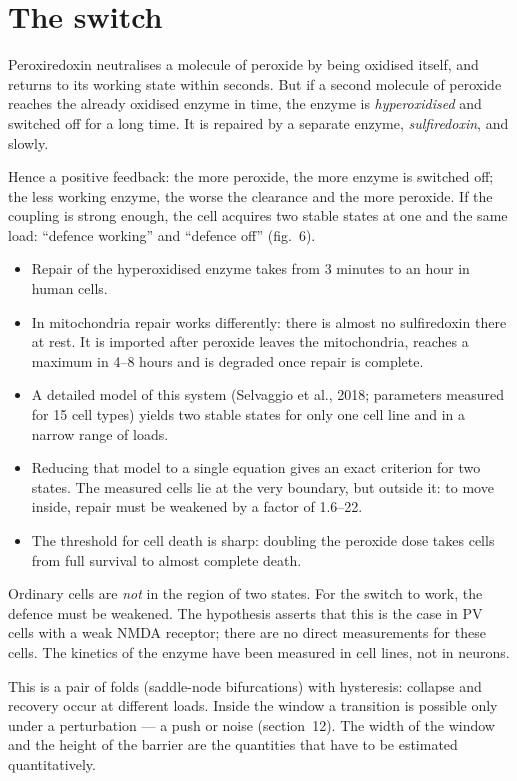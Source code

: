 \section{The switch}
Peroxiredoxin neutralises a molecule of peroxide by being oxidised itself, and returns to its working state within seconds. But if a second molecule of peroxide reaches the already oxidised enzyme in time, the enzyme is \emph{hyperoxidised} and switched off for a long time. It is repaired by a separate enzyme, \emph{sulfiredoxin}, and slowly.

Hence a positive feedback: the more peroxide, the more enzyme is switched off; the less working enzyme, the worse the clearance and the more peroxide. If the coupling is strong enough, the cell acquires two stable states at one and the same load: ``defence working'' and ``defence off'' (fig.~6).
\facts
\begin{itemize}
\item Repair of the hyperoxidised enzyme takes from 3 minutes to an hour in human cells.\tS
\item In mitochondria repair works differently: there is almost no sulfiredoxin there at rest. It is imported after peroxide leaves the mitochondria, reaches a maximum in 4--8 hours and is degraded once repair is complete.\tS
\item A detailed model of this system (Selvaggio et al., 2018; parameters measured for 15 cell types) yields two stable states for only one cell line and in a narrow range of loads.\tS
\item Reducing that model to a single equation gives an exact criterion for two states. The measured cells lie at the very boundary, but outside it: to move inside, repair must be weakened by a factor of 1.6--22.\tD
\item The threshold for cell death is sharp: doubling the peroxide dose takes cells from full survival to almost complete death.\tS
\end{itemize}
\begin{note}
Ordinary cells are \emph{not} in the region of two states. For the switch to work, the defence must be weakened. The hypothesis asserts that this is the case in PV cells with a weak NMDA receptor; there are no direct measurements for these cells. The kinetics of the enzyme have been measured in cell lines, not in neurons.
\end{note}
\begin{ineq}
This is a pair of folds (saddle-node bifurcations) with hysteresis: collapse and recovery occur at different loads. Inside the window a transition is possible only under a perturbation --- a push or noise (section~12). The width of the window and the height of the barrier are the quantities that have to be estimated quantitatively.
\end{ineq}
